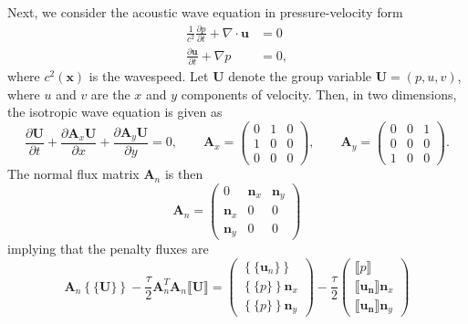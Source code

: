 \documentclass[preprint,10pt]{elsarticle}
\newcommand{\pd}[2]{\frac{\partial#1}{\partial#2}}
\newcommand{\LRc}[1]{\left\{ #1 \right\}}
\newcommand{\Grad} {\ensuremath{\nabla}}
\newcommand{\Div} {\ensuremath{\nabla\cdot}}
\newcommand{\jump}[1] {\ensuremath{\llbracket#1\rrbracket}}
\newcommand{\avg}[1] {\ensuremath{\LRc{\!\{#1\}\!}}}
\begin{document}
Next, we consider the acoustic wave equation in pressure-velocity form
\begin{align*}
\frac{1}{c^2}\pd{p}{t} + \Div \bm{u} &= 0\\
\pd{\bm{u}}{t} + \Grad p &= 0,
\end{align*}
where $c^2(\bm{x})$ is the wavespeed.  Let $\bm{U}$ denote the group variable $\bm{U} = (p,u,v)$, where $u$ and $v$ are the $x$ and $y$ components of velocity.  Then, in two dimensions, the isotropic wave equation is given as
\[
\pd{\bm{U}}{t} + \pd{\bm{A}_x\bm{U}}{x} + \pd{\bm{A}_y\bm{U}}{y} = 0, \qquad \bm{A}_x = 
\left(\begin{array}{ccc}
0 & 1 & 0\\
1 & 0 & 0\\
0 & 0 & 0
\end{array}
\right), \qquad 
\bm{A}_y = 
\left(\begin{array}{ccc}
0 & 0 & 1\\
0 & 0 & 0\\
1 & 0 & 0
\end{array}
\right).
\]
The normal flux matrix $\bm{A}_n$ is then
\[
\bm{A}_n = 
\left(\begin{array}{ccc}
0 & \bm{n}_x & \bm{n}_y\\
\bm{n}_x & 0 & 0\\
\bm{n}_y & 0 & 0
\end{array}
\right)
\]
implying that the penalty fluxes are 
\[
\bm{A}_n \avg{\bm{U}} - \frac{\tau}{2}\bm{A}_n^T\bm{A}_n \jump{\bm{U}} = \left(\begin{array}{c}
\avg{\bm{u}_n}\\
\avg{p }\bm{n}_x\\
\avg{p }\bm{n}_y
\end{array}
\right) - 
\frac{\tau}{2}\left(\begin{array}{c}
\jump{p}\\
\jump{\bm{u_n}}\bm{n}_x\\
\jump{\bm{u_n}}\bm{n}_y
\end{array}
\right)
\]
\end{document}
